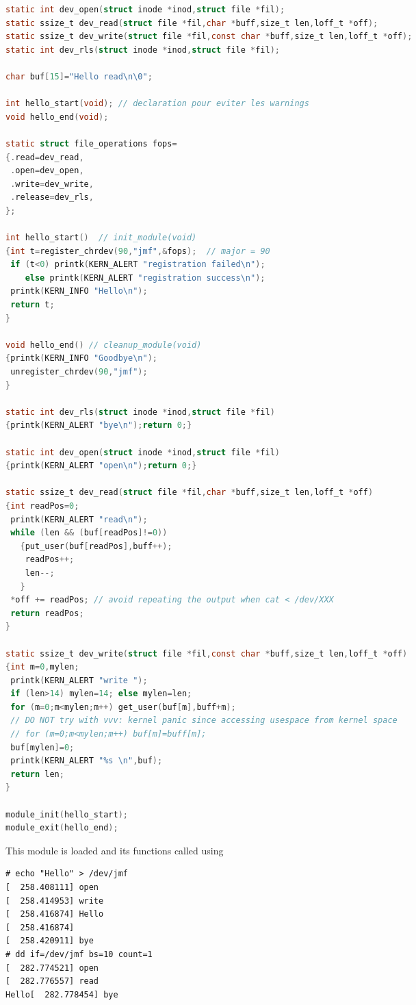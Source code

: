 \documentclass{article}
\begin{document}
{{{\begin{lstlisting}[language=C]
static int dev_open(struct inode *inod,struct file *fil);
static ssize_t dev_read(struct file *fil,char *buff,size_t len,loff_t *off);
static ssize_t dev_write(struct file *fil,const char *buff,size_t len,loff_t *off);
static int dev_rls(struct inode *inod,struct file *fil);

char buf[15]="Hello read\n\0";

int hello_start(void); // declaration pour eviter les warnings
void hello_end(void);

static struct file_operations fops=
{.read=dev_read,
 .open=dev_open,
 .write=dev_write,
 .release=dev_rls,
};

int hello_start()  // init_module(void) 
{int t=register_chrdev(90,"jmf",&fops);  // major = 90
 if (t<0) printk(KERN_ALERT "registration failed\n");
    else printk(KERN_ALERT "registration success\n");
 printk(KERN_INFO "Hello\n");
 return t;
}

void hello_end() // cleanup_module(void)
{printk(KERN_INFO "Goodbye\n");
 unregister_chrdev(90,"jmf");
}

static int dev_rls(struct inode *inod,struct file *fil)
{printk(KERN_ALERT "bye\n");return 0;}

static int dev_open(struct inode *inod,struct file *fil)
{printk(KERN_ALERT "open\n");return 0;}

static ssize_t dev_read(struct file *fil,char *buff,size_t len,loff_t *off)
{int readPos=0;
 printk(KERN_ALERT "read\n");
 while (len && (buf[readPos]!=0)) 
   {put_user(buf[readPos],buff++);
    readPos++;
    len--;
   }
 *off += readPos; // avoid repeating the output when cat < /dev/XXX
 return readPos;
}

static ssize_t dev_write(struct file *fil,const char *buff,size_t len,loff_t *off)
{int m=0,mylen;
 printk(KERN_ALERT "write ");
 if (len>14) mylen=14; else mylen=len;
 for (m=0;m<mylen;m++) get_user(buf[m],buff+m);
 // DO NOT try with vvv: kernel panic since accessing usespace from kernel space
 // for (m=0;m<mylen;m++) buf[m]=buff[m];
 buf[mylen]=0;
 printk(KERN_ALERT "%s \n",buf);
 return len;
}

module_init(hello_start);
module_exit(hello_end);
\end{lstlisting}

This module is loaded and its functions called using
\begin{multicols}{2}
{\footnotesize
\begin{verbatim}
# echo "Hello" > /dev/jmf 
[  258.408111] open
[  258.414953] write 
[  258.416874] Hello
[  258.416874]  
[  258.420911] bye
# dd if=/dev/jmf bs=10 count=1
[  282.774521] open
[  282.776557] read
Hello[  282.778454] bye


\end{verbatim}}
\end{multicols}}}}
\end{document}
